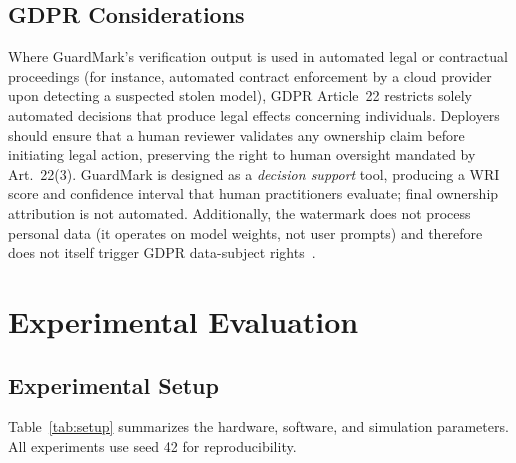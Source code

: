 \documentclass[journal,compsoc]{IEEEtran}
\begin{document}
\subsection{GDPR Considerations}

Where GuardMark's verification output is used in automated legal or
contractual proceedings (for instance, automated contract enforcement by a
cloud provider upon detecting a suspected stolen model), GDPR Article~22
restricts solely automated decisions that produce legal effects concerning
individuals. Deployers should ensure that a human reviewer validates any
ownership claim before initiating legal action, preserving the right to human
oversight mandated by Art.~22(3). GuardMark is designed as a \emph{decision
support} tool, producing a WRI score and confidence interval that human
practitioners evaluate; final ownership attribution is not automated.
Additionally, the watermark does not process personal data (it operates on
model weights, not user prompts) and therefore does not itself trigger GDPR
data-subject rights~\cite{pan2023privacy}.

\section{Experimental Evaluation}
\label{sec:eval}

\subsection{Experimental Setup}

Table~\ref{tab:setup} summarizes the hardware, software, and simulation
parameters. All experiments use seed 42 for reproducibility.
\end{document}
